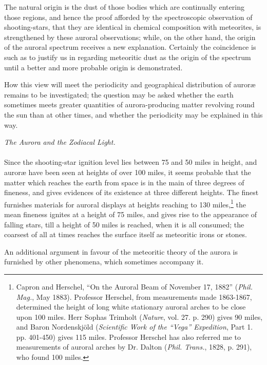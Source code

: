 \documentclass[a4paper, 12pt, oneside, polutonikogreek, english]{article}
\begin{document}
The natural origin is the dust of those bodies which are continually entering those regions, and hence the proof afforded by the spectroscopic observation of shooting-stars, that they are identical in chemical composition with meteorites, is strengthened by these auroral observations; while, on the other hand, the origin of the auroral spectrum receives a new explanation. Certainly the coincidence is such as to justify us in regarding meteoritic dust as the origin of the spectrum until a better and more probable origin is demonstrated.

How this view will meet the periodicity and geographical distribution of auroræ remains to be investigated; the question may be asked whether the earth sometimes meets greater quantities of aurora-producing matter revolving round the sun than at other times, and whether the periodicity may be explained in this way.
\begin{center}
\emph{The Aurora and the Zodiacal Light.}
\end{center}
\paragraph{}
Since the shooting-star ignition level lies between 75 and 50 miles in height, and auroræ have been seen at heights of over 100 miles, it seems probable that the matter which reaches the earth from space is in the main of three degrees of fineness, and gives evidences of its existence at three different heights. The finest furnishes materials for auroral displays at heights reaching to 130 miles,\footnote{Capron and Herschel, ``On the Auroral Beam of November 17, 1882'' (\emph{Phil. Mag.}, May 1883). Professor Herschel, from measurements made 1863-1867, determined the height of long white stationary auroral arches to be close upon 100 miles. Herr Sophas Trimholt (\emph{Nature}, vol. 27. p. 290) gives 90 miles, and Baron Nordenskjöld (\emph{Scientific Work of the ``Vega'' Expedition}, Part 1. pp. 401-450) gives 115 miles. Professor Herschel has also referred me to measurements of auroral arches by Dr. Dalton (\emph{Phil. Trans.}, 1828, p. 291), who found 100 miles.} the mean fineness ignites at a height of 75 miles, and gives rise to the appearance of falling stars, till a height of 50 miles is reached, when it is all consumed; the coarsest of all at times reaches the surface itself as meteoritic irons or stones.

An additional argument in favour of the meteoritic theory of the aurora is furnished by other phenomena, which sometimes accompany it.
\end{document}

